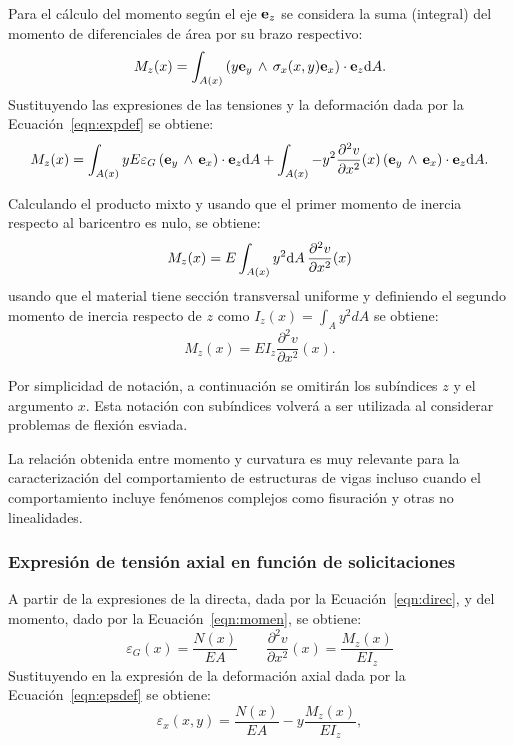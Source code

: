 Para el cálculo del momento según el eje ${\bf e}_z$ se considera la suma (integral) del momento de diferenciales de área por su brazo respectivo:
%
\begin{equation}
M_z (x) = \int_{A(x)} \left( y {\bf e}_y \,  \wedge \, \sigma_x (x,y) {\bf e}_x \right) \cdot {\bf e}_z {\text{d}} A.
\end{equation}
%
Sustituyendo las expresiones de las tensiones y la deformación dada por la Ecuación~\eqref{eqn:expdef} se obtiene:
%
\begin{equation}
M_z (x) = \int_{A(x)} y E \varepsilon_{G} \left( {\bf e}_y \,  \wedge \, {\bf e}_x \right) \cdot {\bf e}_z {\text{d}} A + \int_{A(x)} -y^2 \frac{\partial^2 v}{\partial x^2} (x)  \left( {\bf e}_y \,  \wedge \, {\bf e}_x \right) \cdot {\bf e}_z {\text{d}} A.
\end{equation}

Calculando el producto mixto y usando que el primer momento de inercia respecto al baricentro es nulo, se obtiene:
%
\begin{equation}
M_z (x) = E \int_{A(x)} y^2 {\text{d}} A \,  \frac{\partial^2 v}{\partial x^2} (x)
\end{equation}
%
usando que el material tiene sección transversal uniforme y definiendo el segundo momento de inercia respecto de $z$ como $I_z(x) = \int_{A} y^2 dA$ se obtiene:
%
\begin{equation}\label{eqn:momen}
\boxed{
M_z (x) = E I_z \frac{\partial^2 v}{\partial x^2}(x).
}
\end{equation}

Por simplicidad de notación, a continuación se omitirán los subíndices $z$ y el argumento $x$. %
%
Esta notación con subíndices volverá a ser utilizada al considerar problemas de flexión esviada.

La relación obtenida entre momento y curvatura es muy relevante para la caracterización del comportamiento de estructuras de vigas incluso cuando el comportamiento incluye fenómenos complejos como fisuración y otras no linealidades.


\subsubsection{Expresión de tensión axial en función de solicitaciones}


%
A partir de la expresiones de la directa, dada por la Ecuación~\eqref{eqn:direc}, y del momento, dado por la Ecuación~\eqref{eqn:momen}, se obtiene:
%
\begin{equation}
\varepsilon_G(x) = \frac{	N (x) }{E A}
\qquad
\frac{\partial^2 v}{\partial x^2}(x) = \frac{	M_z (x) }{E I_z} 
\end{equation}
%
Sustituyendo en la expresión de la deformación axial dada por la Ecuación~\eqref{eqn:epsdef} se obtiene:
%
\begin{equation}
\varepsilon_x(x,y) = \frac{	N (x) }{E A}  -y  \frac{ M_z (x) }{E I_z},
\end{equation}

